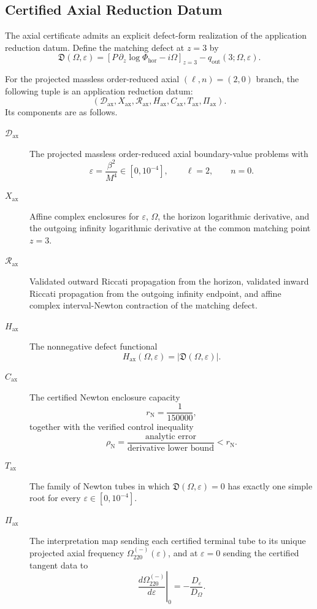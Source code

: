 \subsection{Certified Axial Reduction Datum}

The axial certificate admits an explicit defect-form realization of the
application reduction datum. Define the matching defect at \(z=3\) by
\[
\mathfrak D(\Omega,\varepsilon)
=
{\left[
P\,\partial_z\log\Phi_{\mathrm{hor}}-i\Omega
\right]}_{z=3}
-
q_{\mathrm{out}}(3;\Omega,\varepsilon).
\]

\begin{theorem}
For the projected massless order-reduced axial
\((\ell,n)=(2,0)\) branch, the following tuple is an application reduction
datum:
\[
\left(
\mathcal D_{\mathrm{ax}},
X_{\mathrm{ax}},
\mathcal R_{\mathrm{ax}},
H_{\mathrm{ax}},
C_{\mathrm{ax}},
T_{\mathrm{ax}},
\Pi_{\mathrm{ax}}
\right).
\]
Its components are as follows.

\begin{description}
\item[\(\mathcal D_{\mathrm{ax}}\)]
The projected massless order-reduced axial boundary-value problems with
\[
\varepsilon=\frac{\beta^2}{M^4}\in[0,10^{-4}],
\qquad
\ell=2,
\qquad
n=0.
\]

\item[\(X_{\mathrm{ax}}\)]
Affine complex enclosures for \(\varepsilon\), \(\Omega\), the horizon
logarithmic derivative, and the outgoing infinity logarithmic derivative at
the common matching point \(z=3\).

\item[\(\mathcal R_{\mathrm{ax}}\)]
Validated outward Riccati propagation from the horizon, validated inward
Riccati propagation from the outgoing infinity endpoint, and affine complex
interval-Newton contraction of the matching defect.

\item[\(H_{\mathrm{ax}}\)]
The nonnegative defect functional
\[
H_{\mathrm{ax}}(\Omega,\varepsilon)
=
\left|\mathfrak D(\Omega,\varepsilon)\right|.
\]

\item[\(C_{\mathrm{ax}}\)]
The certified Newton enclosure capacity
\[
r_{\mathrm N}=\frac{1}{150000},
\]
together with the verified control inequality
\[
\rho_{\mathrm N}
=
\frac{\text{analytic error}}
     {\text{derivative lower bound}}
<
r_{\mathrm N}.
\]

\item[\(T_{\mathrm{ax}}\)]
The family of Newton tubes in which
\(\mathfrak D(\Omega,\varepsilon)=0\) has exactly one simple root for every
\(\varepsilon\in[0,10^{-4}]\).

\item[\(\Pi_{\mathrm{ax}}\)]
The interpretation map sending each certified terminal tube to its unique
projected axial frequency
\(\Omega_{220}^{(-)}(\varepsilon)\), and at \(\varepsilon=0\) sending the
certified tangent data to
\[
\left.
\frac{d\Omega_{220}^{(-)}}{d\varepsilon}
\right|_0
=
-\frac{D_{\varepsilon}}{D_{\Omega}}.
\]
\end{description}
\end{theorem}

